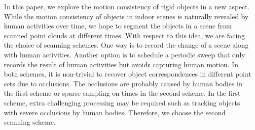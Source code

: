 In this paper, we explore the motion consistency of rigid objects in a new aspect.
While the motion consistency of objects in indoor scenes is naturally revealed by human activities over time, we hope to segment the objects in a scene from scanned point clouds at different times. 
%
With respect to this idea, we are facing the choice of scanning schemes. One way is to record the change of a scene along with human activities. Another option is to schedule a periodic sweep that only records the result of human activities but avoids capturing human motion. 
In both schemes, it is non-trivial to recover object correspondences in different point sets due to occlusions.
The occlusions are probably caused by human bodies in the first scheme or sparse sampling on times in the second scheme. 
%
In the first scheme, extra challenging processing may be required such as tracking objects with severe occlusions by human bodies. Therefore, we choose the second scanning scheme. 

